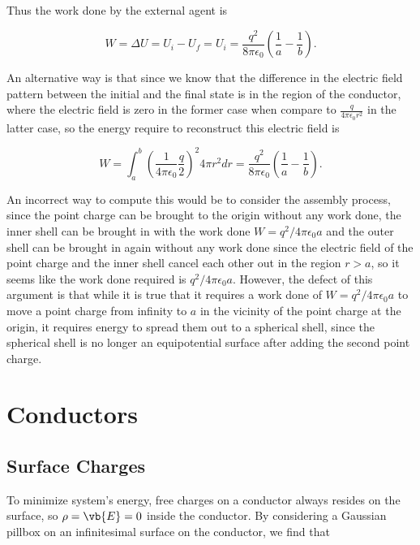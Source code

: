\documentclass[english,a4paper,12pt]{report}
\begin{document}
{Thus the work done by the external agent is

\begin{equation}
    W = \Delta U = U_{i} - U_{f} = U_{i} = \frac{q^2}{8\pi \epsilon_0} (\frac{1}{a} - \frac{1}{b} ) .
\end{equation}

An alternative way is that since we know that the difference in the electric field pattern between the initial and the final state is in the region of the conductor, where the electric field is zero in the former case when compare to \( \frac{q}{4\pi \epsilon _{0} r^2} \) in the latter case, so the energy require to reconstruct this electric field is 

\begin{equation}
    W = \int_{a}^{b} \left(\frac{1}{4\pi\epsilon_0} \frac{q}{2} \right)^2 4\pi r^2dr =   \frac{q^2}{8\pi \epsilon_0} \left(\frac{1}{a} - \frac{1}{b} \right) .
\end{equation}

An incorrect way to compute this would be to consider the assembly process, since the point charge can be brought to the origin without any work done, the inner shell can be brought in with the work done \( W =  q^2/4\pi \epsilon_0 a\) and the outer shell can be brought in again without any work done since the electric field of the point charge and the inner shell cancel each other out in the region \(r > a\), so it seems like the work done required is \( q^2 /4\pi \epsilon_0 a\). However, the defect of this argument is that while it is true that it requires a work done of \(W = q^2/4\pi \epsilon_0 a \) to move a point charge from infinity to \(a\) in the vicinity of the point charge at the origin, it requires energy to spread them out to a spherical shell, since the spherical shell is no longer an equipotential surface after adding the second point charge.}


\section{Conductors}

\subsection{Surface Charges} \label{surcha} 

To minimize system's energy, free charges on a conductor always resides on the surface, so \(\rho  = \vb{E}  = 0 \) inside the conductor. By considering a Gaussian pillbox on an infinitesimal surface on the conductor, we find that 
\end{document}
